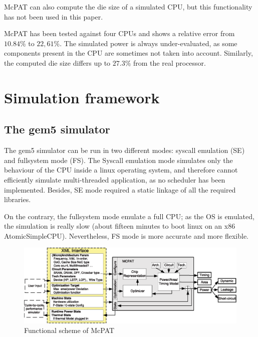 \documentclass{article}
\begin{document}
\begin{multicols}{2}
McPAT can also compute the die size of a simulated CPU, but this functionality has not been used in this paper.


McPAT has been tested against four CPUs\cite{McPAT} and shows a relative error from $10.84\%$ to $22,61\%$. The simulated power is always under-evaluated, as some components present in the CPU are sometimes not taken into account. Similarly, the computed die size differs up to $27.3\%$ from the real processor.



\section{Simulation framework}
\label{sim}

\subsection{The gem5 simulator}

The gem5 simulator can be run in two different modes: syscall emulation (SE) and fullsystem mode (FS). The Syscall emulation mode simulates only the behaviour of the CPU inside a linux operating system, and therefore cannot efficiently simulate multi-threaded application, as no scheduler has been implemented. Besides, SE mode required a static linkage of all the required libraries.

On the contrary, the fullsystem mode emulate a full CPU; as the OS is emulated, the simulation is really slow (about fifteen minutes to boot linux on an x86 AtomicSimpleCPU). Nevertheless, FS mode is more accurate and more flexible.

\end{multicols}
\begin{figure}[ht]
\begin{center}
\includegraphics[width=0.9\linewidth]{McPAT_diag.eps}
\caption{\label{McPAT_schema}Functional scheme of McPAT}
\end{center}
\end{figure}

\newpage
\end{document}
